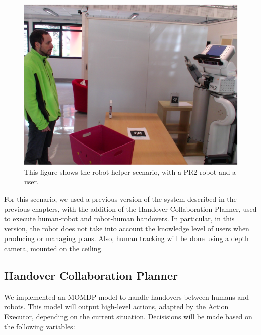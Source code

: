  \begin{figure}[ht!]
 	\centering
 	\includegraphics[scale=0.45]{img/case_study/helper/experiment.pdf}
 	\caption{This figure shows the robot helper scenario, with a PR2 robot and a user.}
 	\label{fig:case_study-helper-pr2helper}
 \end{figure}

For this scenario, we used a previous version of the system described in the previous chapters, with the addition of the Handover Collaboration Planner, used to execute human-robot and robot-human handovers. In particular, in this version, the robot does not take into account the knowledge level of users when producing or managing plans. Also, human tracking will be done using a depth camera, mounted on the ceiling.

\subsection{Handover Collaboration Planner}

We implemented an MOMDP model to handle handovers between humans and robots. This model will output high-level actions, adapted by the Action Executor, depending on the current situation. Decisisions will be made based on the following variables:

